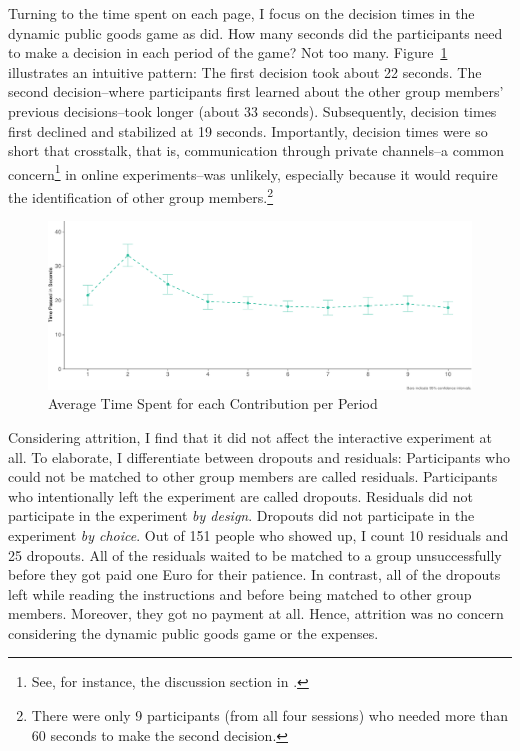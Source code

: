 \documentclass[
  authoryear,
  review,
  3p,
  onecolumn]{elsarticle}
\begin{document}
Turning to the time spent on each page, I focus on the decision times in
the dynamic public goods game as \citet{Anderhub2001} did. How many
seconds did the participants need to make a decision in each period of
the game? Not too many. Figure~\ref{fig-time-spent} illustrates an
intuitive pattern: The first decision took about 22 seconds. The second
decision--where participants first learned about the other group
members' previous decisions--took longer (about 33 seconds).
Subsequently, decision times first declined and stabilized at 19
seconds. Importantly, decision times were so short that crosstalk, that
is, communication through private channels--a common concern\footnote{See,
  for instance, the discussion section in \citet[p.~119]{AGM2018}.} in
online experiments--was unlikely, especially because it would require
the identification of other group members.\footnote{There were only 9
  participants (from all four sessions) who needed more than 60 seconds
  to make the second decision.}

\begin{figure}

{\centering \includegraphics{paper_files/figure-pdf/fig-time-spent-1.pdf}

}

\caption{\label{fig-time-spent}Average Time Spent for each Contribution
per Period}

\end{figure}

Considering attrition, I find that it did not affect the interactive
experiment at all. To elaborate, I differentiate between dropouts and
residuals: Participants who could not be matched to other group members
are called residuals. Participants who intentionally left the experiment
are called dropouts. Residuals did not participate in the experiment
\emph{by design}. Dropouts did not participate in the experiment
\emph{by choice}. Out of 151 people who showed up, I count 10 residuals
and 25 dropouts. All of the residuals waited to be matched to a group
unsuccessfully before they got paid one Euro for their patience. In
contrast, all of the dropouts left while reading the instructions and
before being matched to other group members. Moreover, they got no
payment at all. Hence, attrition was no concern considering the dynamic
public goods game or the expenses.
\end{document}
